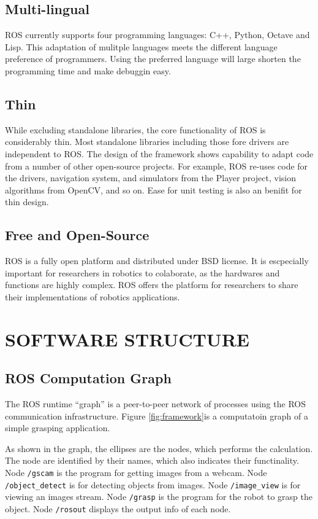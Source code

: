 \documentclass[a4paper, 10pt, conference]{ieeeconf}       %
\begin{document}
\subsection{Multi-lingual}

ROS currently supports four programming languages: C++, Python, Octave and Lisp. This adaptation of mulitple languages meets the different language preference of programmers. Using the preferred language will large shorten the programming time and make debuggin easy.

\subsection{Thin}

While excluding standalone libraries, the core functionality of ROS is considerably thin. Most standalone libraries including those fore drivers are independent to ROS. The design of the framework shows capability to adapt code from a number of other open-source projects. For example, ROS re-uses code for the drivers, navigation system, and simulators from the Player project, vision algorithms from OpenCV, and so on. Ease for unit testing is also an benifit for thin design.

\subsection{Free and Open-Source}

ROS is a fully open platform and distributed under BSD license. It is escpecially important for researchers in robotics to colaborate, as the hardwares and functions are highly complex. ROS offers the platform for researchers to share their implementations of robotics applications.

\section{SOFTWARE STRUCTURE}

\subsection{ROS Computation Graph}
The ROS runtime ``graph'' is a peer-to-peer network of processes using the ROS communication infrastructure. Figure \ref{fig:framework}is a computatoin graph of a simple grasping application.

As shown in the graph, the ellipses are the nodes, which performs the calculation. The node are identified by their names, which also indicates their functinality. Node \texttt{/gscam} is the program for getting images from a webcam. Node \texttt{/object\_detect} is for detecting objects from images. Node \texttt{/image\_view} is for viewing an images stream. Node \texttt{/grasp} is the program for the robot to grasp the object. Node \texttt{/rosout} displays the output info of each node.
\end{document}
